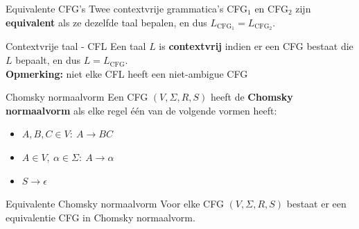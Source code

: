 \begin{theo}{Equivalente CFG's}
    \vspace{-0.1cm}
    Twee contextvrije grammatica's CFG$_1$ en CFG$_2$ zijn \textbf{equivalent} als ze dezelfde taal bepalen, en dus $L_{\text{CFG}_1} = L_{\text{CFG}_2}$.
    \vspace{-0.1cm}
\end{theo}

\begin{theo}{Contextvrije taal - CFL}
    \vspace{-0.1cm}
    Een taal $L$ is \textbf{contextvrij} indien er een CFG bestaat die $L$ bepaalt, en dus $L = L_{\text{CFG}}$. \\

    \vspace{-0.1cm}
    \textbf{Opmerking:} niet elke CFL heeft een niet-ambigue CFG
\end{theo}

\begin{theo}{Chomsky normaalvorm}
    \vspace{-0.1cm}
    Een CFG $(V, \Sigma, R, S)$ heeft de \textbf{Chomsky normaalvorm} als elke regel één van de volgende vormen heeft:
    \begin{itemize}
        \item $A,B,C \in V: \ A \to BC$
        \item $A \in V, \ \alpha \in \Sigma: \ A \to \alpha$ 
        \item $S \to \epsilon$
    \end{itemize}
    \vspace{-0.3cm}
\end{theo}

\begin{lem}{Equivalente Chomsky normaalvorm}
    \vspace{-0.1cm}
    Voor elke CFG $(V, \Sigma, R, S)$ bestaat er een equivalentie CFG in Chomsky normaalvorm.
    \vspace{-0.1cm}
\end{lem}

\newpage

